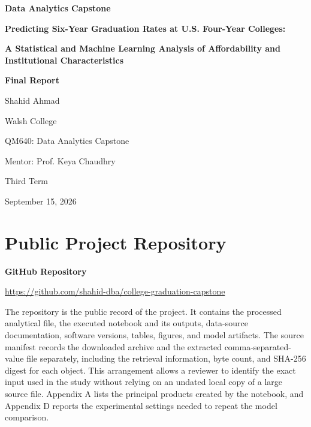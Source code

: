 \documentclass[12pt,a4paper]{article}
\begin{document}
\thispagestyle{fancy}
\begin{center}
\vspace*{0.55in}
{\bfseries Data Analytics Capstone\par}

\vspace{0.85in}
{\bfseries Predicting Six-Year Graduation Rates at U.S. Four-Year Colleges:\par}
\vspace{0.10in}
{\bfseries A Statistical and Machine Learning Analysis of Affordability and Institutional Characteristics\par}

\vspace{1.05in}
{\bfseries Final Report\par}

\vspace{0.75in}
Shahid Ahmad

Walsh College

QM640: Data Analytics Capstone

Mentor: Prof. Keya Chaudhry

Third Term

September 15, 2026
\end{center}
\clearpage
\section*{Public Project Repository}

\begin{center}
\textbf{GitHub Repository}

\url{https://github.com/shahid-dba/college-graduation-capstone}
\end{center}

The repository is the public record of the project. It contains the processed analytical file, the executed notebook and its outputs, data-source documentation, software versions, tables, figures, and model artifacts. The source manifest records the downloaded archive and the extracted comma-separated-value file separately, including the retrieval information, byte count, and SHA-256 digest for each object. This arrangement allows a reviewer to identify the exact input used in the study without relying on an undated local copy of a large source file. Appendix A lists the principal products created by the notebook, and Appendix D reports the experimental settings needed to repeat the model comparison.
\end{document}
